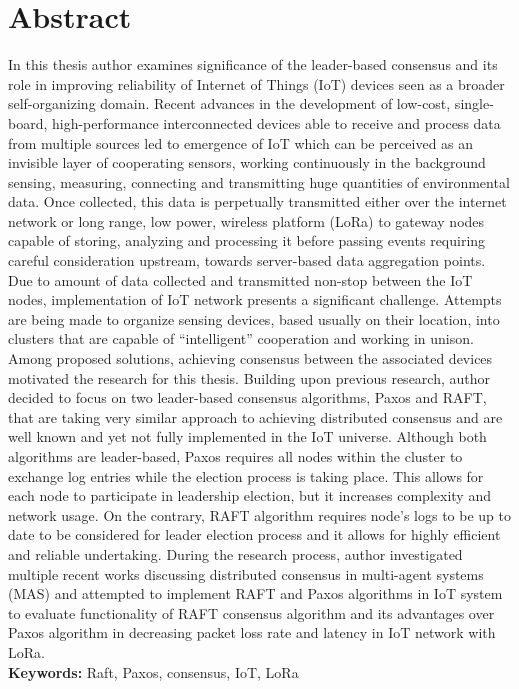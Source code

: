 \documentclass[oneside,12pt]{book}
\begin{document}
\chapter*{Abstract}
\par In this thesis author examines significance of the leader-based consensus and its role in improving reliability of Internet of Things (IoT) devices seen as a broader self-organizing domain. Recent advances in the development of low-cost, single-board, high-performance interconnected devices able to receive and process data from multiple sources led to emergence of IoT which can be perceived as an invisible layer of cooperating sensors, working continuously in the background sensing, measuring, connecting and transmitting huge quantities of environmental data. Once collected, this data is perpetually transmitted either over the internet network or long range, low power, wireless platform (LoRa) to gateway nodes capable of storing, analyzing and processing it before passing events requiring careful consideration upstream, towards server-based data aggregation points. Due to amount of data collected and transmitted non-stop between the IoT nodes, implementation of IoT network presents a significant challenge. Attempts are being made to organize sensing devices, based usually on their location, into clusters that are capable of “intelligent” cooperation and working in unison. Among proposed solutions, achieving consensus between the associated devices motivated the research for this thesis. Building upon previous research, author decided to focus on two leader-based consensus algorithms, Paxos and RAFT, that are taking very similar approach to achieving distributed consensus and are well known and yet not fully implemented in the IoT universe. Although both algorithms are leader-based, Paxos requires all nodes within the cluster to exchange log entries while the election process is taking place. This allows for each node to participate in leadership election, but it increases complexity and network usage. On the contrary, RAFT algorithm requires node’s logs to be up to date to be considered for leader election process and it allows for highly efficient and reliable undertaking. During the research process, author investigated multiple recent works discussing distributed consensus in multi-agent systems (MAS) and attempted to implement RAFT and Paxos algorithms in IoT system to evaluate functionality of RAFT consensus algorithm and its advantages over Paxos algorithm in decreasing packet loss rate and latency in IoT network with LoRa.
\\
\vfill
\noindent
\textbf{Keywords:} \quad Raft, Paxos, consensus, IoT, LoRa
\end{document}
